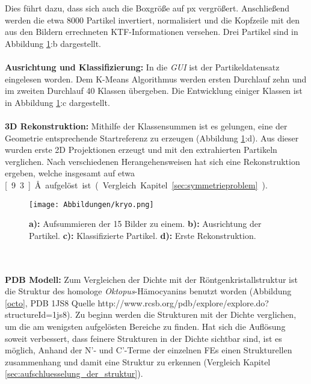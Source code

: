 Dies führt dazu, dass sich auch die Boxgröße auf \unit[512]{px} vergrößert.
Anschließend werden die etwa 8000 Partikel invertiert, normalisiert und die Kopfzeile mit den aus den Bildern errechneten KTF-Informationen versehen.
Drei Partikel sind in Abbildung \ref{kryo_schema}:b dargestellt.
\\
\\
\textbf{Ausrichtung und Klassifizierung:}
In die \textit{GUI} ist der Partikeldatensatz eingelesen worden.
Dem K-Means Algorithmus werden ersten Durchlauf zehn und im zweiten Durchlauf 40 Klassen übergeben.
Die Entwicklung einiger Klassen ist in Abbildung \ref{kryo_schema}:c dargestellt.
\\
\\
\textbf{3D Rekonstruktion:} 
Mithilfe der Klassensummen ist es gelungen, eine der Geometrie entsprechende Startreferenz zu erzeugen (Abbildung \ref{kryo_schema}:d).
Aus dieser wurden erste 2D Projektionen erzeugt und mit den extrahierten Partikeln verglichen.
Nach verschiedenen Herangehensweisen hat sich eine Rekonstruktion ergeben, welche insgesamt auf etwa \unit[9.3]{\AA} aufgelöst ist (Vergleich Kapitel \ref{sec:symmetrieproblem}).
\begin{figure}
	\texttt{[image: Abbildungen/kryo.png]}
	\caption[Kryo: Weg zur ersten Rekonstruktion]{\textbf{a):} Aufsummieren der 15 Bilder zu einem. \textbf{b):} Ausrichtung der Partikel. \textbf{c):} Klassifizierte Partikel. \textbf{d):} Erste Rekonstruktion.}
	\label{kryo_schema}
\end{figure}
\\
\\
\textbf{PDB Modell:}
Zum Vergleichen der Dichte mit der Röntgenkristallstruktur ist die Struktur des homologe \textit{Oktopus}-Hämocyanins benutzt worden (Abbildung \ref{octo}, PDB 1JS8 Quelle http://www.rcsb.org/pdb/explore/explore.do?structureId=1js8).
Zu beginn werden die Strukturen mit der Dichte verglichen, um die am wenigsten aufgelösten Bereiche zu finden. Hat sich die Auflösung soweit verbessert, dass feinere Strukturen in der Dichte sichtbar sind, ist es möglich, Anhand der N'- und C'-Terme der einzelnen FEs einen Strukturellen zusammenhang und damit eine Struktur zu erkennen (Vergleich Kapitel \ref{sec:aufschluesselung_der_struktur}).

\FloatBarrier